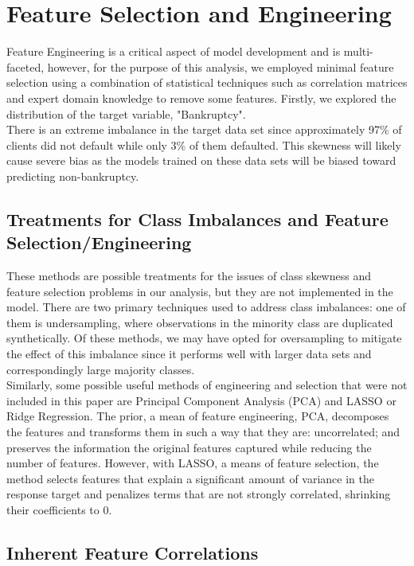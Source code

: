 \documentclass[12pt]{report}
\begin{document}
\section{Feature Selection and Engineering} 

Feature Engineering is a critical aspect of model development and is multi-faceted, however, for the purpose of this analysis, we employed minimal feature selection using a combination of statistical techniques such as correlation matrices and expert domain knowledge to remove some features. Firstly, we explored the distribution of the target variable, "Bankruptcy". \\%
\indent There is an extreme imbalance in the target data set since approximately 97\% of clients did not default while only 3\% of them defaulted. This skewness will likely cause severe bias as the models trained on these data sets will be biased toward predicting non-bankruptcy.

\subsection{Treatments for Class Imbalances and Feature Selection/Engineering}

These methods are possible treatments for the issues of class skewness and feature selection problems in our analysis, but they are not implemented in the model. There are two primary techniques used to address class imbalances: one of them is undersampling, where observations in the minority class are duplicated synthetically. Of these methods, we may have opted for oversampling to mitigate the effect of this imbalance since it performs well with larger data sets and correspondingly large majority classes. \\
\indent Similarly, some possible useful methods of engineering and selection that were not included in this paper are Principal Component Analysis (PCA) and LASSO or Ridge Regression. The prior, a mean of feature engineering, PCA, decomposes the features and transforms them in such a way that they are: uncorrelated; and preserves the information the original features captured while reducing the number of features. However, with LASSO, a means of feature selection, the method selects features that explain a significant amount of variance in the response target and penalizes terms that are not strongly correlated, shrinking their coefficients to 0.  \\

\subsection{Inherent Feature Correlations}
\end{document}
